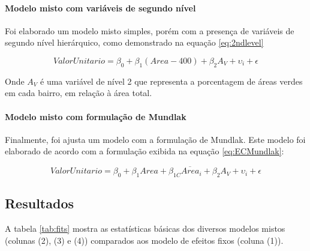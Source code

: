 \documentclass[
  a4paper, 12pt]{article}
\begin{document}
\hypertarget{modelo-misto-com-variuxe1veis-de-segundo-nuxedvel}{%
\paragraph{Modelo misto com variáveis de segundo
nível}\label{modelo-misto-com-variuxe1veis-de-segundo-nuxedvel}}

Foi elaborado um modelo misto simples, porém com a presença de variáveis
de segundo nível hierárquico, como demonstrado na equação
\ref{eq:2ndlevel}

\begin{equation} \label{eq:2ndlevel}
ValorUnitario = \beta_0 + \beta_1 (Area - 400) + \beta_2 A_V+ \upsilon_i + \epsilon
\end{equation}

Onde \(A_V\) é uma variável de nível 2 que representa a porcentagem de
áreas verdes em cada bairro, em relação à área total.

\hypertarget{modelo-misto-com-formulauxe7uxe3o-de-mundlak}{%
\paragraph{Modelo misto com formulação de
Mundlak}\label{modelo-misto-com-formulauxe7uxe3o-de-mundlak}}

Finalmente, foi ajusta um modelo com a formulação de Mundlak. Este
modelo foi elaborado de acordo com a formulação exibida na equação
\ref{eq:ECMundlak}:

\begin{equation} \label{eq:ECMundlak}
ValorUnitario = \beta_0 + \beta_1 Area + \beta_{1C} \overline{Area}_i + \beta_2 A_V+ \upsilon_i + \epsilon
\end{equation}

\hypertarget{resultados}{%
\subsection{Resultados}\label{resultados}}

A tabela \ref{tab:fits} mostra as estatísticas básicas dos diversos
modelos mistos (colunas (2), (3) e (4)) comparados aos modelo de efeitos
fixos (coluna (1)).
\end{document}
